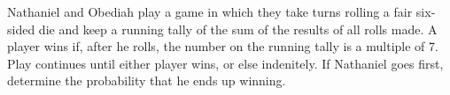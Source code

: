 Nathaniel and Obediah play a game in which they take turns rolling a fair six-sided die and keep a
running tally of the sum of the results of all rolls made. A player wins if, after he rolls, the number on the running tally is a multiple of 7. Play continues until either player wins, or else indenitely. If Nathaniel goes first, determine the probability that he ends up winning.